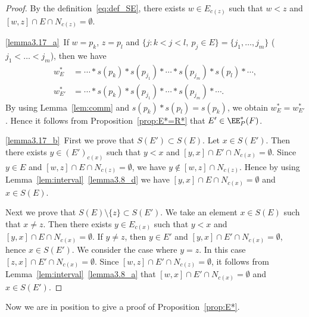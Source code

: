 \begin{proof}
By the definition~\eqref{eq:def_SE}, 
there exists $w \in E_{c(z)}$ such that $w < z$ and $[w,z] \cap E \cap N_{c(z)} = \emptyset$.

\ref{lemma3.17_a}~If $w = p_k$, $z = p_l$ and $\{ j : k < j < l, \ p_j \in E \} = \{ j_1, \dots, j_m \}$ 
($j_1 < \dots < j_m$), then we have 
\begin{align*}
w^*_E &= \cdots * s(p_k) * s(p_{j_1}) * \cdots * s(p_{j_m}) * s(p_l) * \cdots,
\\
w^*_{E'} &= \cdots * s(p_k) * s(p_{j_1}) * \cdots * s(p_{j_m}) * \cdots.
\end{align*}
By using Lemma~\ref{lem:comm} and $s(p_k)*s(p_l) = s(p_k)$, 
we obtain $w^*_E = w^*_{E'}$.
Hence it follows from Proposition~\ref{prop:E*=R*} that $E' \in \EE^*_P(F)$.

\ref{lemma3.17_b}~First we prove that $S(E') \subset S(E)$.
Let $x \in S(E')$.
Then there exists $y \in (E')_{c(x)}$ such that $y < x $ and $[y,x] \cap E' \cap N_{c(x)} = \emptyset$.
Since $y \in E$ and $[w,z] \cap E \cap N_{c(z)} = \emptyset$, we have $y \not\in [w,z] \cap N_{c(z)}$.
Hence by using Lemma~\ref{lem:interval}~\ref{lemma3.8_d} we have $[y,x] \cap E \cap N_{c(x)} = \emptyset$ and $x \in S(E)$.

Next we prove that $S(E) \setminus \{ z \} \subset S(E')$.
We take an element $x \in S(E)$ such that $x \neq z$.
Then there exists $y \in E_{c(x)}$ such that $y<x$ and $[y,x] \cap E \cap N_{c(x)} = \emptyset$.
If $y \neq z$, then $y \in E'$ and $[y,x] \cap E' \cap N_{c(x)} = \emptyset$, hence $x \in S(E')$.
We consider the case where $y = z$.
In this case $[z,x] \cap E' \cap N_{c(x)} = \emptyset$.
Since $[w,z] \cap E' \cap N_{c(z)} = \emptyset$, it follows from Lemma~\ref{lem:interval}~\ref{lemma3.8_a} 
that $[w,x] \cap E' \cap N_{c(x)} = \emptyset$ and $x \in S(E')$.
\end{proof}

Now we are in position to give a proof of Proposition~\ref{prop:E*}.

